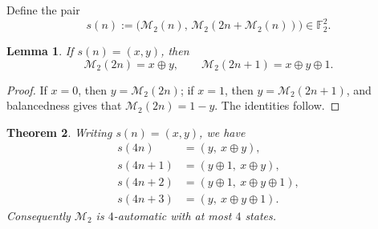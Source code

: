 \documentclass[12pt,reqno]{article}
\theoremstyle{plain}
\newtheorem{theorem}{Theorem}
\newtheorem{lemma}[theorem]{Lemma}
\theoremstyle{definition}
\theoremstyle{remark}
\begin{document}
 Define the pair
\begin{equation}\label{eq:M2-state} 
 s(n) := \bigl(\mathcal{M}_{2}(n),\,\mathcal{M}_{2}(2n+\mathcal{M}_{2}(n))\bigr)\in\mathbb{F}_2^2.
\end{equation}

\begin{lemma}\label{lem:M2-recover} 
 If $s(n)=(x,y)$, then $$\mathcal{M}_{2}(2 n) = x\oplus y, \qquad \mathcal{M}_{2}(2n+1)=x\oplus y\oplus 1.$$
\end{lemma}

\begin{proof}
 If $x=0$, then $y=\mathcal{M}_{2}(2n)$; if $x=1$, then $y=\mathcal{M}_{2}(2n+1)$, and balancedness gives that
 $\mathcal{M}_{2}(2n)=1-y$. The identities follow.
\end{proof}

\begin{theorem}\label{thm:M2-affine} 
Writing $s(n)=(x,y)$, we have
\begin{align*}
 s(4n) &= (y,\ x\oplus y),\\
 s(4n+1) &= (y\oplus 1,\ x\oplus y),\\
 s(4n+2) &= (y\oplus 1,\ x\oplus y\oplus 1),\\
 s(4n+3) &= (y,\ x\oplus y\oplus 1).
\end{align*}
Consequently $\mathcal{M}_{2}$ is $4$-automatic with at most $4$ states.
\end{theorem}
\end{document}
